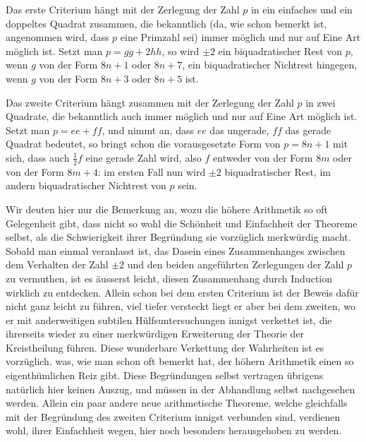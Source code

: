 Das erste Criterium hängt mit der Zerlegung der Zahl $p$ in ein einfaches und ein doppeltes Quadrat zusammen, die bekanntlich (da, wie schon bemerkt ist, angenommen wird, dass $p$ eine Primzahl sei) immer möglich und nur auf Eine Art möglich ist. Setzt man $p=gg+2hh$, so wird $\pm2$ ein biquadratischer Rest von $p$, wenn $g$ von der Form $8n+1$ oder $8n+7$, ein biquadratischer Nichtrest hingegen, wenn $g$ von der Form $8n+3$ oder $8n+5$ ist.

Das zweite Criterium hängt zusammen mit der Zerlegung der Zahl $p$ in zwei Quadrate, die bekanntlich auch immer möglich und nur auf Eine Art möglich ist. Setzt man $p=ee+ff$, und nimmt an, dass $ee$ das ungerade, $ff$ das gerade Quadrat bedeutet, so bringt schon die vorausgesetzte Form von $p=8n+1$ mit sich, dass auch $\frac12f$ eine gerade Zahl wird, also $f$ entweder von der Form $8m$ oder von der Form $8m+4$: im ersten Fall nun wird $\pm2$ biquadratischer Rest, im andern biquadratischer Nichtrest von $p$ sein.

Wir deuten hier nur die Bemerkung an, wozu die höhere Arithmetik so oft Gelegenheit gibt, dass nicht so wohl die Schönheit und Einfachheit der Theoreme selbst, als die Schwierigkeit ihrer Begründung sie vorzüglich merkwürdig macht. Sobald man einmal veranlasst ist, das Dasein eines Zusammenhanges zwischen dem Verhalten der Zahl $\pm2$ und den beiden angeführten Zerlegungen der Zahl $p$ zu vermuthen, ist es äusserst leicht, diesen Zusammenhang durch Induction wirklich zu entdecken. Allein schon bei dem ersten Criterium ist der Beweis dafür nicht ganz leicht zu führen, viel tiefer versteckt liegt er aber bei dem zweiten, wo er mit anderweitigen subtilen Hülfsuntersuchungen innigst verkettet ist, die ihrerseits wieder zu einer merkwürdigen Erweiterung der Theorie der Kreistheilung führen. Diese wunderbare Verkettung der Wahrheiten ist es vorzüglich. was, wie man schon oft bemerkt hat, der höhern Arithmetik einen so eigenthümlichen Reiz gibt. Diese Begründungen selbst vertragen übrigens natürlich hier keinen Auszug, und müssen in der Abhandlung selbst nachgesehen werden. Allein ein paar andere neue arithmetische Theoreme, welche gleichfalls mit der Begründung des zweiten Criterium innigst verbunden sind, verdienen wohl, ihrer Einfachheit wegen, hier noch besonders herausgehoben zu werden.

